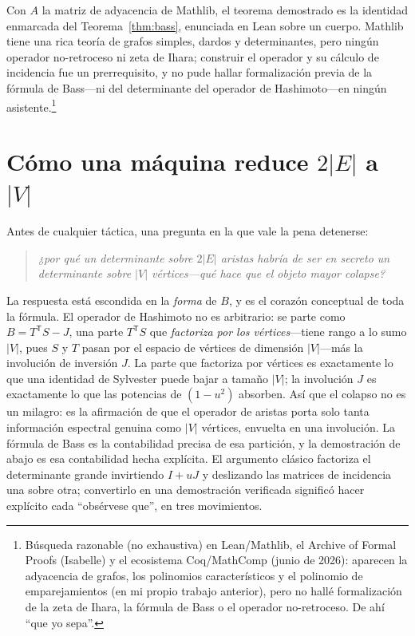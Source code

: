 \documentclass[11pt]{article}
\begin{document}
Con $A$ la matriz de adyacencia de Mathlib, el teorema demostrado es la identidad enmarcada del
Teorema~\ref{thm:bass}, enunciada en Lean sobre un cuerpo. Mathlib tiene una rica teor\'ia de grafos
simples, dardos y determinantes, pero ning\'un operador no-retroceso ni zeta de Ihara; construir el
operador y su c\'alculo de incidencia fue un prerrequisito, y no pude hallar formalizaci\'on previa de
la f\'ormula de Bass---ni del determinante del operador de Hashimoto---en ning\'un asistente.\footnote{B\'usqueda
razonable (no exhaustiva) en Lean/Mathlib, el Archive of Formal Proofs (Isabelle) y el ecosistema
Coq/MathComp (junio de 2026): aparecen la adyacencia de grafos, los polinomios caracter\'isticos y el
polinomio de emparejamientos (en mi propio trabajo anterior), pero no hall\'e formalizaci\'on de la
zeta de Ihara, la f\'ormula de Bass o el operador no-retroceso. De ah\'i ``que yo sepa''.}

\section{C\'omo una m\'aquina reduce $2|E|$ a $|V|$}
\label{sec:proof}

Antes de cualquier t\'actica, una pregunta en la que vale la pena detenerse:
\begin{quote}\itshape
  ¿por qu\'e un determinante sobre $2|E|$ aristas habr\'ia de ser en secreto un determinante sobre
  $|V|$ v\'ertices---qu\'e hace que el objeto mayor colapse?
\end{quote}
La respuesta est\'a escondida en la \emph{forma} de $B$, y es el coraz\'on conceptual de toda la
f\'ormula. El operador de Hashimoto no es arbitrario: se parte como $B=T^{\mathsf T}S-J$, una parte
$T^{\mathsf T}S$ que \emph{factoriza por los v\'ertices}---tiene rango a lo sumo $|V|$, pues $S$ y $T$
pasan por el espacio de v\'ertices de dimensi\'on $|V|$---m\'as la involuci\'on de inversi\'on $J$. La
parte que factoriza por v\'ertices es exactamente lo que una identidad de Sylvester puede bajar a
tama\~no $|V|$; la involuci\'on $J$ es exactamente lo que las potencias de $(1-u^2)$ absorben. As\'i
que el colapso no es un milagro: es la afirmaci\'on de que el operador de aristas porta solo tanta
informaci\'on espectral genuina como $|V|$ v\'ertices, envuelta en una involuci\'on. La f\'ormula de Bass es
la contabilidad precisa de esa partici\'on, y la demostraci\'on de abajo es esa contabilidad hecha
expl\'icita. El argumento cl\'asico factoriza el determinante grande invirtiendo $I+uJ$ y deslizando
las matrices de incidencia una sobre otra; convertirlo en una demostraci\'on verificada signific\'o
hacer expl\'icito cada ``obs\'ervese que'', en tres movimientos.
\end{document}
